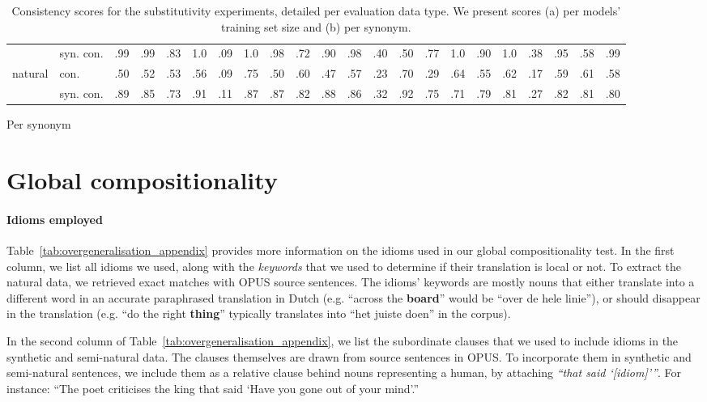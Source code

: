 \begin{table*}[!h]
\begin{subtable}[b]{\textwidth}
\begin{tabular}{llcccccccccccccccccccc}
 & syn. con.        & .99  & .99  & .83  & 1.0  & .09  & 1.0  & .98  & .72  & .90  & .98  & .40  & .50  & .77  & 1.0  & .90  & 1.0  & .38  & .95  & .58  & .99  \\
natural & con.      & .50  & .52  & .53  & .56  & .09  & .75  & .50  & .60  & .47  & .57  & .23  & .70  & .29  & .64  & .55  & .62  & .17  & .59  & .61  & .58  \\
 & syn. con.        & .89  & .85  & .73  & .91  & .11  & .87  & .87  & .82  & .88  & .86  & .32  & .92  & .75  & .71  & .79  & .81  & .27  & .82  & .81  & .80  \\    \bottomrule
    \end{tabular}
    \caption{Per synonym}
    \end{subtable}
    \caption{Consistency scores for the substitutivity experiments, detailed per evaluation data type. We present scores (a) per models' training set size and (b) per synonym.}
    \label{tab:substitutivity_appendix}
\end{table*}

\clearpage

\section{Global compositionality}
\label{ap:global_compositionality}

\paragraph{Idioms employed}
Table~\ref{tab:overgeneralisation_appendix} provides more information on the idioms used in our global compositionality test. 
In the first column, we list all idioms we used, along with the \emph{keywords} that we used to determine if their translation is local or not.
To extract the natural data, we retrieved exact matches with OPUS source sentences. 
The idioms' keywords are mostly nouns that either translate into a different word in an accurate paraphrased translation in Dutch (e.g. ``across the \textbf{board}'' would be ``over de hele linie''), or should disappear in the translation (e.g. ``do the right \textbf{thing}'' typically translates into ``het juiste doen'' in the corpus). 

In the second column of Table~\ref{tab:overgeneralisation_appendix}, we list the subordinate clauses that we used to include idioms in the synthetic and semi-natural data.
The clauses themselves are drawn from source sentences in OPUS.
To incorporate them in synthetic and semi-natural sentences, we include them as a relative clause behind nouns representing a human, by attaching \emph{``that said `[idiom]'''}. 
For instance: ``The poet criticises the king that said `Have you gone out of your mind'.''

